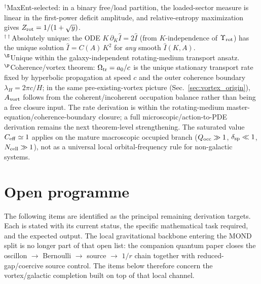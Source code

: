 \documentclass[11pt]{article}
\begin{document}
\medskip\noindent
${}^{\dagger}$MaxEnt-selected: in a binary free/load partition,
the loaded-sector measure is linear in the first-power deficit amplitude,
and relative-entropy maximization gives $Z_{\rm rot}=1/(1+\sqrt{y})$.\\
${}^{\dagger\dagger}$Absolutely unique: the ODE
$K\,\partial_K\hat I=2\hat I$ (from $K$-independence of
$\Upsilon_{\rm rot}$) has the unique solution
$\hat I=C(A)\,K^2$ for \emph{any} smooth $\hat I(K,A)$.\\
${}^{\S}$Unique within the galaxy-independent rotating-medium
transport ansatz.\\
${}^{\P}$Coherence/vortex theorem: $\Omega_{\rm tr}=a_0/c$ is the unique
stationary transport rate fixed by hyperbolic propagation at speed $c$
and the outer coherence boundary $\lambda_H=2\pi c/H$; in the same
pre-existing-vortex picture (Sec.~\ref{sec:vortex_origin}),
$A_{\rm vort}$ follows from the coherent/incoherent occupation balance
rather than being a free closure input.  The rate derivation is within the
rotating-medium master-equation/coherence-boundary closure; a full
microscopic/action-to-PDE derivation remains the next theorem-level
strengthening.  The saturated value $C_{\rm eff}\simeq1$ applies on the
mature macroscopic occupied branch ($Q_{\rm occ}\gg1$,
$\delta_{\rm sp}\ll1$, $N_{\rm cell}\gg1$), not as a universal local
orbital-frequency rule for non-galactic systems.


{}
\section*{Open programme}\label{sec:open_programme}

The following items are identified as the principal remaining
derivation targets.  Each is stated with its current status, the
specific mathematical task required, and the expected output.
The local gravitational backbone entering the MOND split is no longer
part of that open list: the companion quantum paper closes the
oscillon $\to$ Bernoulli $\to$ source $\to$ $1/r$ chain together with
reduced-gap/coercive source control.  The items below therefore concern
the vortex/galactic completion built on top of that local channel.
\end{document}
